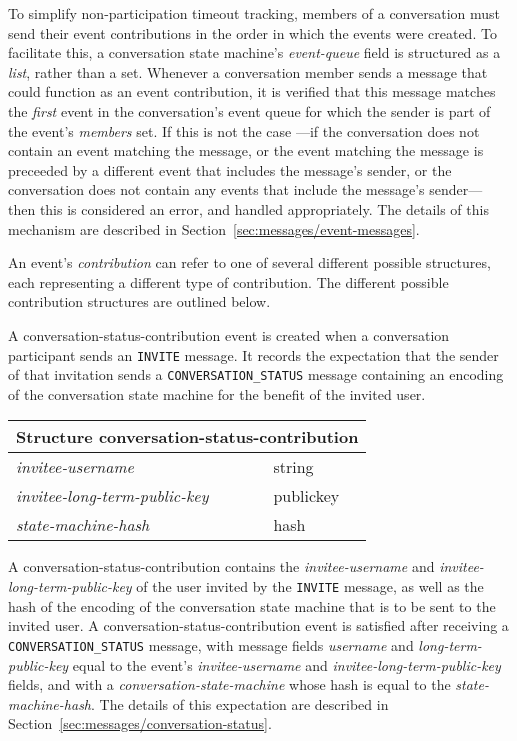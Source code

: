 \documentclass{article}
\def\message#1{\texttt{#1}}
\def\field#1{\textit{#1}}
\def\smfield#1{\textsl{#1}}
\def\type#1{\textsf{#1}}
\newenvironment{struct}[1]{
\newcommand{\structfield}[2]{
\smfield{##1} & \type{##2} \\
\hline
}
\par
\vspace{-\medskipamount}
\hspace{2em minus 2em}\begin{tabular}{|l|l|}
\hline
\multicolumn{2}{|c|}{Structure \type{#1}} \\
\hline
\hline
}{
\end{tabular}
\vspace{-\medskipamount}
\par
}
\begin{document}
To simplify non-participation timeout tracking, members of a conversation must send their event contributions in the order in which the events were created.
To facilitate this, a conversation state machine's \smfield{event-queue} field is structured as a \emph{list}, rather than a set.
Whenever a conversation member sends a message that could function as an event contribution, it is verified that this message matches the \emph{first} event in the conversation's event queue for which the sender is part of the event's \smfield{members} set.
If this is not the case ---if the conversation does not contain an event matching the message, or the event matching the message is preceeded by a different event that includes the message's sender, or the conversation does not contain any events that include the message's sender--- then this is considered an error, and handled appropriately.
The details of this mechanism are described in Section~\ref{sec:messages/event-messages}.

An event's \smfield{contribution} can refer to one of several different possible structures, each representing a different type of contribution.
The different possible contribution structures are outlined below.


A \type{conversation-status-contribution} event is created when a conversation participant sends an \message{INVITE} message.
It records the expectation that the sender of that invitation sends a \message{CONVERSATION\_STATUS} message containing an encoding of the conversation state machine for the benefit of the invited user.
\begin{struct}{conversation-status-contribution}
\structfield{invitee-username}{string}
\structfield{invitee-long-term-public-key}{publickey}
\structfield{state-machine-hash}{hash}
\end{struct}
A \type{conversation-status-contribution} contains the \smfield{invitee-username} and \smfield{invitee-long-term-public-key} of the user invited by the \message{INVITE} message, as well as the hash of the encoding of the conversation state machine that is to be sent to the invited user.
A \type{conversation-status-contribution} event is satisfied after receiving a \message{CONVERSATION\_STATUS} message, with message fields \field{username} and \field{long-term-public-key} equal to the event's \smfield{invitee-username} and \smfield{invitee-long-term-public-key} fields, and with a \field{conversation-state-machine} whose hash is equal to the \smfield{state-machine-hash}.
The details of this expectation are described in Section~\ref{sec:messages/conversation-status}.
\end{document}
